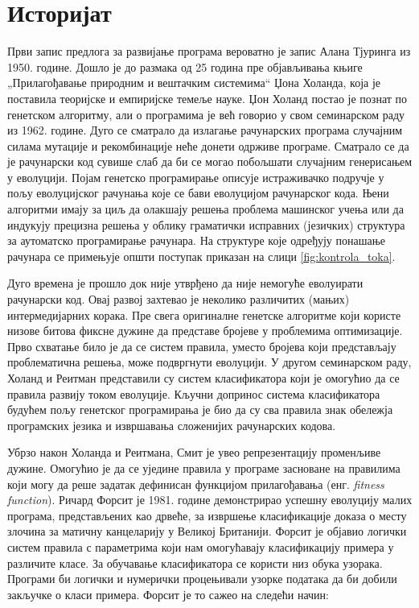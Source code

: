 \documentclass[a4paper]{article}
\begin{document}
\section{Историјат}
Први запис предлога за развијање програма вероватно је запис Алана Тјуринга из 1950. године. Дошло је до размака од 25 година пре објављивања књиге „Прилагођавање природним и вештачким системима“ Џона Холанда, која је поставила теоријске и емпиријске темеље науке.
Џон Холанд постао је познат по генетском алгоритму, али о програмима је већ говорио у свом семинарском раду из 1962. године. Дуго се сматрало да излагање рачунарских програма
случајним силама мутације и рекомбинације неће донети одрживе програме. Сматрало се да је рачунарски код сувише слаб да би се могао побољшати случајним генерисањем у еволуцији.
Појам генетско програмирање описује истраживачко подручје у пољу еволуцијског рачунања које се бави еволуцијом рачунарског кода. Њени алгоритми имају за циљ да олакшају решења проблема машинског учења или да индукују прецизна решења у облику граматички исправних (језичких) структура за аутоматско програмирање рачунара. На структуре које одређују понашање рачунара се примењује општи поступак приказан на слици \ref{fig:kontrola_toka}.


Дуго времена је прошло док није утврђено  да није немогуће еволуирати рачунарски код. Овај развој захтевао је неколико различитих (мањих) интермедијарних корака. Пре свега оригиналне генетске алгоритме који користе низове битова фиксне дужине да представе бројеве у проблемима оптимизације. Прво схватање било је да се систем правила, уместо бројева који представљају проблематична решења, може подвргнути еволуцији. У другом семинарском раду, Холанд и Реитман представили су систем класификатора који је омогућио да се правила развију током еволуције. Кључни допринос система класификатора будућем пољу генетског програмирања је био да су сва правила знак обележја програмских језика и извршавања сложенијих рачунарских кодова.


Убрзо након Холанда и Реитмана, Смит је увео репрезентацију променљиве дужине.  Омогућио је да се уједине правила у програме засноване на правилима који могу да реше задатак дефинисан функцијом прилагођавања (енг.\textit{ fitness function}). Ричард Форсит је 1981. године демонстрирао успешну еволуцију малих програма, представљених као дрвеће, за извршење класификације доказа о месту злочина за матичну канцеларију у Великој Британији. Форсит је објавио логички систем правила с параметрима који нам омогућавају класификацију примера у различите класе. За обучавање класификатора се користи низ обука узорака. Програми би логички и нумерички процењивали узорке података да би добили закључке о класи примера. Форсит је то сажео на следећи начин:
\end{document}
